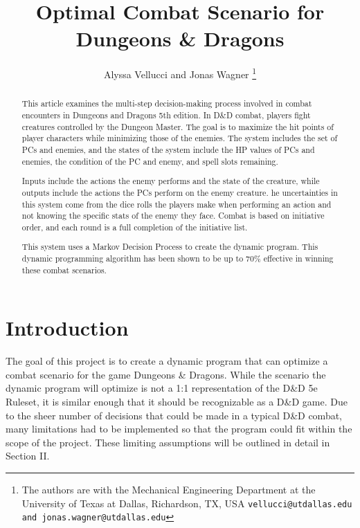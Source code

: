 \documentclass[letterpaper, 10 pt, conference]{ieeeconf}
\title{
    \LARGE \bf
    Optimal Combat Scenario for Dungeons \& Dragons
}
\author{
    Alyssa Vellucci and Jonas Wagner
    \thanks{
        The authors are with the Mechanical Engineering Department at the University of Texas at Dallas, Richardson, TX, USA 
    {\tt\small vellucci@utdallas.edu and jonas.wagner@utdallas.edu}
    }
}
\begin{document}
\maketitle
\begin{abstract}

    This article examines the multi-step decision-making process involved in combat encounters in Dungeons and Dragons 5th edition. 
    In D\&D combat, players fight creatures controlled by the Dungeon Master. 
    The goal is to maximize the hit points of player characters while minimizing those of the enemies. 
    The system includes the set of PCs and enemies, and the states of the system include the HP values of PCs and enemies, the condition of the PC and enemy, and spell slots remaining.

    Inputs include the actions the enemy performs and the state of the creature, while outputs include the actions the PCs perform on the enemy creature. 
    he uncertainties in this system come from the dice rolls the players make when performing an action and not knowing the specific stats of the enemy they face. 
    Combat is based on initiative order, and each round is a full completion of the initiative list.

    This system uses a Markov Decision Process to create the dynamic program.  
    This dynamic programming algorithm has been shown to be up to 70\% effective in winning these combat scenarios.


\end{abstract}


\section{Introduction}
The goal of this project is to create a dynamic program that can optimize a combat scenario for the game Dungeons \& Dragons. While the scenario the dynamic program will 
optimize is not a 1:1 representation of the D\&D 5e Ruleset, it is similar enough that it should be recognizable as a D\&D game. Due to the sheer number of decisions that could
be made in a typical D\&D combat, many limitations had to be implemented so that the program could fit within the scope of the project. These limiting assumptions will be outlined
in detail in Section II. 
\end{document}
